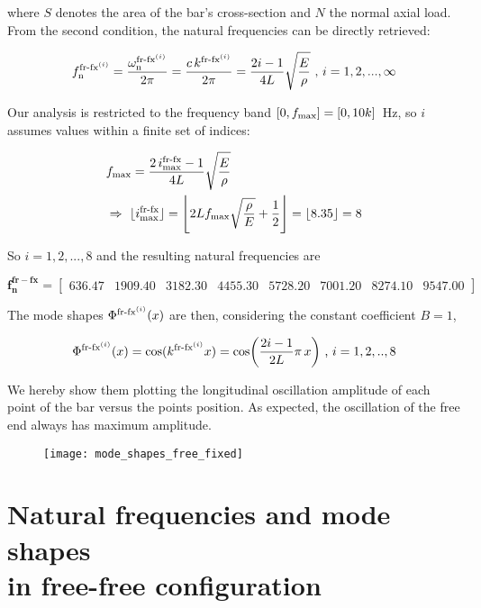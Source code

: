 \documentclass[a4paper,12pt,oneside]{article}
\begin{document}
where $ S $ denotes the area of the bar's cross-section and $ N $ the normal axial load. From the second condition, the natural frequencies can be directly retrieved:

\[
	f_\textup{n}^{\textup{fr-fx}^{(i)}} = %
		\frac{\omega_\textup{n}^{\textup{fr-fx}^{(i)}}}{2 \pi} = %
		\frac{c \, k^{\textup{fr-fx}^{(i)}}}{2 \pi} = %
		\frac{2i - 1}{4L} \sqrt{\frac{E}{\rho}} ~ \text{,} ~ i = 1,2,...,\infty
\]

Our analysis is restricted to the frequency band $ [0, f_\textup{max}] = [0, 10k] \, $ Hz, so $ i $ assumes values within a finite set of indices:

\[ \begin{split}
	& f_\textup{max} = \frac{2 \, i^\textup{fr-fx}_\textup{max} - 1}{4L} %
		\sqrt{\frac{E}{\rho}} \\
	& \Rightarrow ~ \lfloor i^\textup{fr-fx}_\textup{max} \rfloor = %
		\Biggl\lfloor 2 L f_\textup{max} %
		\sqrt{\frac{\rho}{E}} + \frac{1}{2} \Biggr\rfloor = \lfloor 8.35 \rfloor = 8
\end{split} \]

So $ i = 1,2,...,8 $ and the resulting natural frequencies are

\[
	\mathbf{f_n^{fr-fx}} =	\begin{bmatrix}
														636.47		& 1909.40	& 3182.30	& 4455.30 %
														& 5728.20	& 7001.20	& 8274.10	& 9547.00
													\end{bmatrix}
\]

The mode shapes $ \Phi^{\textup{fr-fx}^{(i)}}(x) $ are then, considering the constant coefficient $ B = 1 $,

\[
	\Phi^{\textup{fr-fx}^{(i)}}(x) = \cos(k^{\textup{fr-fx}^{(i)}} x) =
		\cos\biggl(\frac{2i - 1}{2L} \pi \, x\biggr) ~ \text{,} ~ i = 1,2,..,8
\]

We hereby show them plotting the longitudinal oscillation amplitude of each point of the bar versus the points position. As expected, the oscillation of the free end always has maximum amplitude.

\begin{figure}[h]
	\hspace{-70pt}
	\texttt{[image: mode\_shapes\_free\_fixed]}
\end{figure}


\section{Natural frequencies and mode shapes \\ in free-free configuration}
\end{document}
